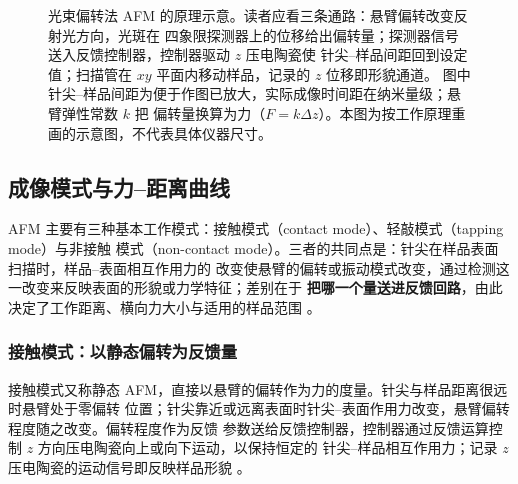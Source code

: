 \begin{figure}[htbp]
\caption{光束偏转法 AFM 的原理示意。读者应看三条通路：悬臂偏转改变反射光方向，光斑在
四象限探测器上的位移给出偏转量；探测器信号送入反馈控制器，控制器驱动 $z$ 压电陶瓷使
针尖--样品间距回到设定值；扫描管在 $xy$ 平面内移动样品，记录的 $z$ 位移即形貌通道。
图中针尖--样品间距为便于作图已放大，实际成像时间距在纳米量级；悬臂弹性常数 $k$ 把
偏转量换算为力（$F=k\Delta z$）。本图为按工作原理重画的示意图，不代表具体仪器尺寸。
\schemamark{}}
\label{fig:afm-setup}
\end{figure}

\subsection{成像模式与力--距离曲线}
\label{sec:afm-modes}

AFM 主要有三种基本工作模式：接触模式（contact mode）、轻敲模式（tapping mode）与非接触
模式（non-contact mode）。三者的共同点是：针尖在样品表面扫描时，样品--表面相互作用力的
改变使悬臂的偏转或振动模式改变，通过检测这一改变来反映表面的形貌或力学特征；差别在于
\textbf{把哪一个量送进反馈回路}，由此决定了工作距离、横向力大小与适用的样品范围
。

\subsubsection{接触模式：以静态偏转为反馈量}

接触模式又称静态 AFM，直接以悬臂的偏转作为力的度量。针尖与样品距离很远时悬臂处于零偏转
位置；针尖靠近或远离表面时针尖--表面作用力改变，悬臂偏转程度随之改变。偏转程度作为反馈
参数送给反馈控制器，控制器通过反馈运算控制 $z$ 方向压电陶瓷向上或向下运动，以保持恒定的
针尖--样品相互作用力；记录 $z$ 压电陶瓷的运动信号即反映样品形貌
。

